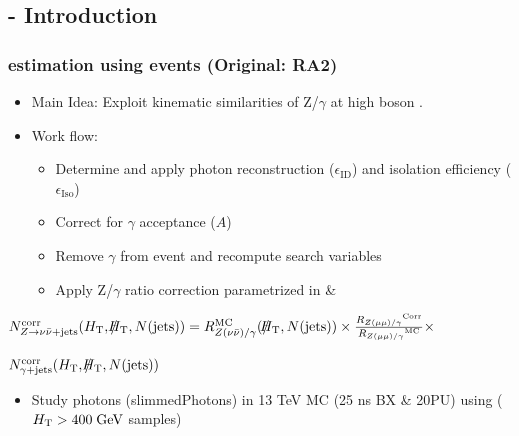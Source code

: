 \documentclass{beamer}
\begin{document}
\subsection{\photonJets - Introduction}
\begin{frame}
\frametitle{\ZInv estimation using \photonJets events \small(Original: RA2)}
\begin{itemize}
 \item Main Idea: Exploit kinematic similarities of Z/$\gamma$ at high boson \pt.
 \item Work flow:
 \begin{itemize}
  \item Determine and apply photon reconstruction ($\epsilon_{\text{ID}}$) and isolation efficiency ($\epsilon_{\text{Iso}}$)
  \item Correct for $\gamma$ acceptance ($A$)
  \item Remove $\gamma$ from event and recompute search variables
  \item Apply Z/$\gamma$ ratio correction parametrized in \MHT \& \NJets
 \end{itemize}
\end{itemize}

$
N_{Z\to\nu\bar\nu\text{+jets}}^{\text{corr}} (H_{\text{T}}, \slash\mkern-12mu{H}_{\text{T}}, N(\text{jets})) =
                                                        R^{\text{MC}}_{Z(\nu\bar\nu)/\gamma}
                                                         (\slash\mkern-12mu{H}_{\text{T}},N(\text{jets})) 
                                                        \times
                                                       \frac{{R_{Z(\mu\mu)/\gamma}}^{\text{Corr}}}{{R_{Z(\mu\mu)/\gamma}}^{\text{MC}}} \times$\\
                                                       \begin{center}
                                                        $ N_{\gamma\text{+jets}}^{\text{corr}} (H_{\text{T}},\slash\mkern-12mu{H}_{\text{T}},N(\text{jets}))$
                                                       \end{center}

 \begin{block}{}
 \centering
 \begin{itemize}
  \item Study photons (slimmedPhotons) in 13 TeV MC (25 ns BX \& 20PU) using \photonJets ($H_{\text{T}}>400\;\text{Ge}\kern-0.06667em\text{V}$ samples)
 
 \end{itemize}
 \end{block}

\end{frame}
\end{document}
